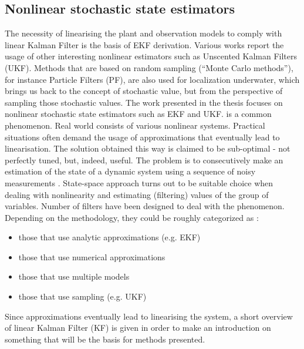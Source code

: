 \subsection{Nonlinear stochastic state estimators}
The necessity of linearising the plant and observation models to comply with linear Kalman Filter is the basis of EKF derivation. Various works report the usage of other interesting nonlinear estimators such as Unscented Kalman Filters (UKF). Methods that are based on random sampling (``Monte Carlo methods''), for instance Particle Filters (PF), are also used for localization underwater, which brings us back to the concept of stochastic value, but from the perspective of sampling those stochastic values. The work presented in the thesis focuses on nonlinear stochastic state estimators such as EKF and UKF.
 is a common phenomenon. Real world consists of various nonlinear systems. Practical situations often demand the usage of approximations that eventually lead to linearisation. The solution obtained this way is claimed to be sub-optimal - not perfectly tuned, but, indeed, useful. The problem is to consecutively make an estimation of the state of a dynamic system using a sequence of noisy measurements \cite{ristic04}. State-space approach turns out to be suitable choice when dealing with nonlinearity and estimating (filtering) values of the group of variables. Number of filters have been designed to deal with the phenomenon. Depending on the methodology, they could be roughly categorized as \cite{ristic04}: 
\begin{itemize}
\item those that use analytic approximations (e.g. EKF)
\item those that use numerical approximations
\item those that use multiple models
\item those that use sampling (e.g. UKF)
\end{itemize} 
Since approximations eventually lead to linearising the system, a short overview of linear Kalman Filter (KF) is given in order to make an introduction on something that will be the basis for methods presented.
